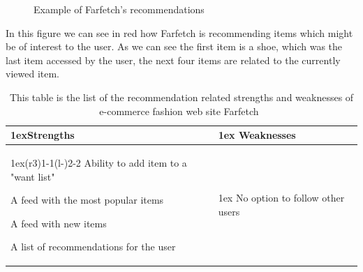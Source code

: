 \begin{figure}[H]
    \centering
    \caption{Example of Farfetch's recommendations}
    \label{figure:farfetchedRecommendationExample}
\end{figure}

In this figure we can see in red how Farfetch is recommending items which might
be of interest to the user. As we can see the first item is a shoe, which was
the last item accessed by the user, the next four items are related to the
currently viewed item.

\begin{table}[H]
    \centering
    \begin{tabularx}{\linewidth}{>{\parskip1ex}X@{\kern4\tabcolsep}>{\parskip1ex}X}
      \toprule
      \hfil\bfseries Strengths
      &
      \hfil\bfseries Weaknesses
        \\\cmidrule(r{3\tabcolsep}){1-1}\cmidrule(l{-\tabcolsep}){2-2}
            Ability to add item to a "want list" \par
            A feed with the most popular items \par
            A feed with new items \par
            A list of recommendations for the user \par
          &
            No option to follow other users \par
         \\\bottomrule
    \end{tabularx}
    \caption[Recommendation related strengths and weaknesses of Farfetch~\cite{Farfetch}]{This table is the list of the recommendation related strengths and weaknesses of e-commerce fashion web site Farfetch~\cite{Farfetch}}
    \label{table:ecommenreceFarfetch}
\end{table}

